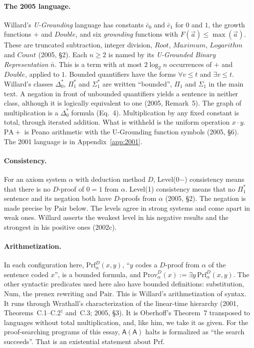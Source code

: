 \documentclass[11pt]{article}
\newcommand{\Prog}[1]{\mathsf{#1}}
\newcommand{\fs}[1]{\ifmmode\text{\guillemotleft#1\guillemotright}\else\guillemotleft#1\guillemotright\fi}
\newcommand{\Prov}{\mathrm{Prov}}
\newcommand{\Prf}{\mathrm{Prf}}
\newcommand{\Pair}{\mathrm{Pair}}
\newcommand{\sk}{\ensuremath{^\dagger}}    %
\theoremstyle{plain}
\theoremstyle{definition}
\begin{document}
\paragraph{The 2005 language.} Willard's \emph{U-Grounding} language has
constants $\bar c_0$ and $\bar c_1$ for $0$ and $1$, the growth functions $+$
and $\mathit{Double}$, and six \emph{grounding} functions with
$F(\vec a) \le \max(\vec a)$. These are truncated subtraction, integer
division, $\mathit{Root}$, $\mathit{Maximum}$, $\mathit{Logarithm}$ and
$\mathit{Count}$ (2005, \S2). Each $n \ge 2$ is named by its \emph{U-Grounded
Binary Representation} $\bar n$. This is a term with at most $2\log_2 n$
occurrences of $+$ and $\mathit{Double}$, applied to $1$. Bounded quantifiers
have the forms $\forall v \le t$ and $\exists v \le t$. Willard's classes
$\Delta_0^*$, $\Pi_1^*$ and $\Sigma_1^*$ are written ``bounded'', $\Pi_1$ and
$\Sigma_1$ in the main text. A negation in front of unbounded quantifiers
yields a sentence in neither class, although it is logically equivalent to
one (2005, Remark~5). The graph of multiplication is a $\Delta_0^*$ formula
(Eq.~4). Multiplication by any fixed constant is total, through iterated
addition. What is withheld is the uniform operation $x \cdot y$.
$\mathrm{PA}{+}$ is Peano arithmetic with the U-Grounding function symbols
(2005, \S6). The 2001 language is in Appendix~\ref{app:2001}.

\paragraph{Consistency.} For an axiom system $\alpha$ with deduction method
$D$, Level(0$-$) consistency means that there is no $D$-proof of $0 = 1$ from
$\alpha$. Level(1) consistency means that no $\Pi_1^*$ sentence and its
negation both have $D$-proofs from $\alpha$ (2005, \S2). The negation is
made precise by $\Pair$ below. The levels agree in strong systems and come
apart in weak ones. Willard asserts the weakest level in his negative results
and the strongest in his positive ones (2002c).

\paragraph{Arithmetization.} In each configuration here,
$\Prf^D_\alpha(x,y)$, ``$y$ codes a $D$-proof from $\alpha$ of the sentence
coded $x$'', is a bounded formula, and $\Prov^D_\alpha(x) := \exists
y\,\Prf^D_\alpha(x,y)$. The other syntactic predicates used here also have
bounded definitions: substitution, $\mathrm{Num}$, the prenex rewriting and
$\Pair$. This is Willard's arithmetization of syntax. It runs through
Wrathall's characterization of the linear-time hierarchy (2001,
Theorems~C.1--C.2\sk{} and~C.3; 2005, \S3). It is Oberhoff's Theorem~7
transposed to languages without total multiplication, and, like him, we take
it as given. For the proof-searching programs of this essay,
\fs{$\Prog{A}(\Prog{A})$ halts} is formalized as ``the search succeeds''. That
is an existential statement about $\Prf$.
\end{document}
